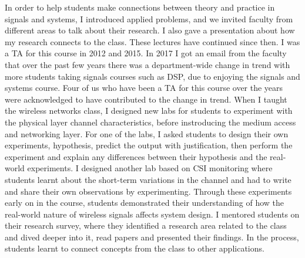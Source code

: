 \documentclass[10pt]{article}
\begin{document}
In order to help students make connections between theory and practice in signals and systems,  %
I introduced applied problems, and we invited faculty from different areas to talk about their research. I also gave a presentation about how my research connects to the class. These lectures have continued since then.  I was a TA for this course in 2012 and 2015. In 2017 I got an email from the faculty that over the past few years there was a department-wide change in trend with more students taking signals courses such as DSP, due to enjoying the signals and systems course. Four of us who have been a TA for this course over the years were acknowledged to have contributed to the change in trend. When I taught the wireless networks class, I designed new labs for students to experiment with the physical layer channel characteristics, before instroducing the medium access and networking layer. %
For one of the labs, I asked students to design their own experiments, hypothesis, predict the output with justification, then perform the experiment and explain any differences between their hypothesis and the real-world experiments. 
I designed another lab based on CSI monitoring where students learnt about the short-term variations in the channel and had to write and share their own observations by experimenting. Through these experiments early on in the course, students demonstrated their understanding of how the real-world nature of wireless signals affects system design. I mentored students on their research survey, where they identified a research area related to the class and dived deeper into it, read papers and presented their findings. In the process, students learnt to connect concepts from the class to other applications.\\
\end{document}
